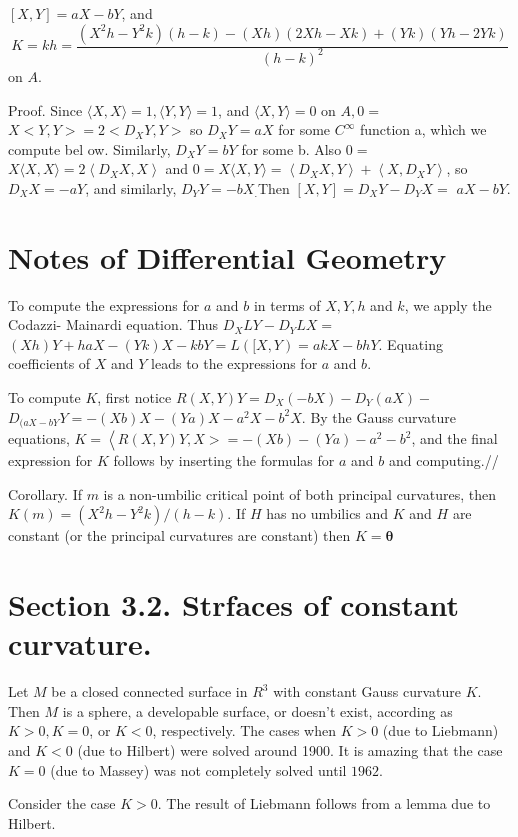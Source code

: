 \documentclass[10pt]{article}
\begin{document}
$[X, Y]=a X-b Y$, and
$$
K=k h=\frac{\left(X^{2} h-Y^{2} k\right)(h-k)-(X h)(2 X h-X k)+(Y k)(Y h-2 Y k)}{(h-k)^{2}}
$$
on $A$.

Proof. Since $\langle X, X\rangle=1,\langle Y, Y\rangle=1$, and $\langle X, Y\rangle=0$ on $A, 0=$ $X<Y, Y>=2<D_{X} Y, Y>$ so $D_{X} Y=a X$ for some $C^{\infty}$ function a, whìch we compute bel ow. Similarly, $D_{X} Y=b Y$ for some b. Also $0=$ $X\langle X, X\rangle=2\left\langle D_{X} X, X\right\rangle$ and $0=X\langle X, Y\rangle=\left\langle D_{X} X, Y\right\rangle+\left\langle X, D_{X} Y\right\rangle$, so $D_{X} X=-a Y$, and similarly, $D_{Y} Y=-b X_{.}$Then $[X, Y]=D_{X} Y-D_{Y} X=$ $a X-b Y$.

\section{Notes of Differential Geometry}
To compute the expressions for $a$ and $b$ in terms of $X, Y, h$ and $k$, we apply the Codazzi- Mainardi equation. Thus $D_{X} L Y-D_{Y} L X=$ $(X h) Y+h a X-(Y k) X-k b Y=L([X, Y)=a k X-b h Y$. Equating coefficients of $X$ and $Y$ leads to the expressions for $a$ and $b$.

To compute $K$, first notice $R(X, Y) Y=D_{X}(-b X)-D_{Y}(a X)-$ $D_{(a X-b Y} Y=-(X b) X-(Y a) X-a^{2} X-b^{2} X .$ By the Gauss curvature equations, $K=\left\langle R(X, Y) Y, X>=-(X b)-(Y a)-a^{2}-b^{2}\right.$, and the final expression for $K$ follows by inserting the formulas for $a$ and $b$ and computing.//

Corollary. If $m$ is a non-umbilic critical point of both principal curvatures, then $K(m)=\left(X^{2} h-Y^{2} k\right) /(h-k)$. If $H$ has no umbilics and $K$ and $H$ are constant (or the principal curvatures are constant) then $K=\boldsymbol{\theta}$

\section{Section 3.2. Strfaces of constant curvature.}
Let $M$ be a closed connected surface in $R^{3}$ with constant Gauss curvature $K .$ Then $M$ is a sphere, a developable surface, or doesn't exist, according as $K>0, K=0$, or $K<0$, respectively. The cases when $K>0$ (due to Liebmann) and $K<0$ (due to Hilbert) were solved around 1900. It is amazing that the case $K=0$ (due to Massey) was not completely solved until $1962 .$

Consider the case $K>0$. The result of Liebmann follows from a lemma due to Hilbert.
\end{document}
